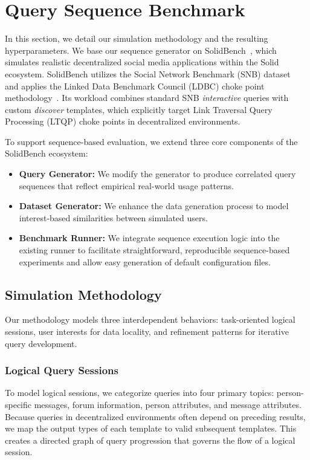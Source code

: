 \section{Query Sequence Benchmark}

In this section, we detail our simulation methodology and the resulting hyperparameters.
We base our sequence generator on SolidBench~\cite{taelman2023link}, 
which simulates realistic decentralized social media applications within the Solid ecosystem.
SolidBench utilizes the Social Network Benchmark (SNB) dataset~\cite{erling2015ldbc,angles2020ldbc} 
and applies the Linked Data Benchmark Council (LDBC) choke point methodology~\cite{angles2014linked}.
Its workload combines standard SNB \textit{interactive} queries with custom \textit{discover} templates,
which explicitly target Link Traversal Query Processing (LTQP) choke points in decentralized environments. 

To support sequence-based evaluation, we extend three core components of the SolidBench ecosystem:

\begin{itemize}
    \item \textbf{Query Generator:} We modify the generator to produce correlated query sequences that reflect empirical real-world usage patterns.
    
    \item \textbf{Dataset Generator:} We enhance the data generation process to model interest-based similarities between simulated users.
    
    \item \textbf{Benchmark Runner:} We integrate sequence execution logic into the existing runner to facilitate straightforward, reproducible sequence-based experiments and allow easy generation of default configuration files.
\end{itemize}

\subsection{Simulation Methodology}
Our methodology models three interdependent behaviors: task-oriented logical sessions,
user interests for data locality,
and refinement patterns for iterative query development.

\subsubsection{Logical Query Sessions}
To model logical sessions, we categorize queries into four primary topics: 
person-specific messages, forum information, person attributes, and message attributes. 
Because queries in decentralized environments often depend on preceding results, 
we map the output types of each template to valid subsequent templates. 
This creates a directed graph of query progression that governs the flow of a logical session.

